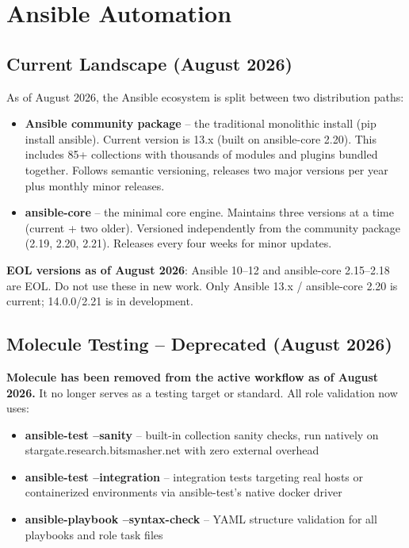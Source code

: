 \section{Ansible Automation}

\subsection{Current Landscape (August 2026)}

As of August 2026, the Ansible ecosystem is split between two distribution paths:

\begin{itemize}
    \item \textbf{Ansible community package} -- the traditional monolithic install (pip install ansible). Current version is 13.x (built on ansible-core 2.20). This includes 85+ collections with thousands of modules and plugins bundled together. Follows semantic versioning, releases two major versions per year plus monthly minor releases.
    
    \item \textbf{ansible-core} -- the minimal core engine. Maintains three versions at a time (current + two older). Versioned independently from the community package (2.19, 2.20, 2.21). Releases every four weeks for minor updates.

\end{itemize}

\textbf{EOL versions as of August 2026}: Ansible 10--12 and ansible-core 2.15--2.18 are EOL. Do not use these in new work. Only Ansible 13.x / ansible-core 2.20 is current; 14.0.0/2.21 is in development.

\subsection{Molecule Testing -- Deprecated (August 2026)}

\textbf{Molecule has been removed from the active workflow as of August 2026.} It no longer serves as a testing target or standard. All role validation now uses:

\begin{itemize}
    \item \textbf{ansible-test --sanity} -- built-in collection sanity checks, run natively on stargate.research.bitsmasher.net with zero external overhead
    \item \textbf{ansible-test --integration} -- integration tests targeting real hosts or containerized environments via ansible-test's native docker driver
    \item \textbf{ansible-playbook --syntax-check} -- YAML structure validation for all playbooks and role task files
    
\end{itemize}


